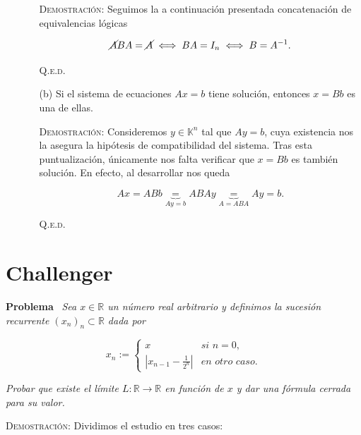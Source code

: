 \documentclass{article}
\begin{document}
\begin{enumerate}
\begin{enumerate}
        \vspace{7px}

        \textsc{Demostración}: Seguimos la a continuación presentada concatenación de equivalencias lógicas

        \[\cancel{A}BA = \cancel{A} \iff BA = I_n \iff B = A^{-1}.\]

        \hfill{\textsc{Q.e.d.}}

        \vspace{7px}

        \item[(b)] Si el sistema de ecuaciones $Ax = b$ tiene solución, entonces $x = Bb$ es una de ellas.
        
        \vspace{7px}

        \textsc{Demostración}: Consideremos $y \in \mathbb{K}^n$ tal que $Ay = b$, cuya existencia nos la asegura la hipótesis de compatibilidad del sistema. Tras esta puntualización, únicamente nos falta verificar que $x = Bb$ es también solución. En efecto, al desarrollar nos queda

        \[Ax = ABb \underbrace{=}_{Ay = b} ABAy \underbrace{=}_{A = ABA} Ay = b.\]

        \hfill{\textsc{Q.e.d.}}
    \end{enumerate}
\end{enumerate}

\newpage

\section{Challenger}

\noindent\textbf{Problema} \, \textit{Sea $x \in \mathbb{R}$ un número real arbitrario y definimos la sucesión recurrente $(x_n)_n \subset \mathbb{R}$ dada por}

\[
x_n :=
\begin{cases}
    x & \textit{si $n = 0$,} \\
    \left|x_{n-1} - \frac{1}{2^n}\right| & \textit{en otro caso.}
\end{cases}
\]

\noindent \textit{Probar que existe el límite $L : \mathbb{R} \rightarrow \mathbb{R}$ en función de $x$ y dar una fórmula cerrada para su valor.}

\vspace{7px}

\noindent\textsc{Demostración}: Dividimos el estudio en tres casos:
\end{document}
